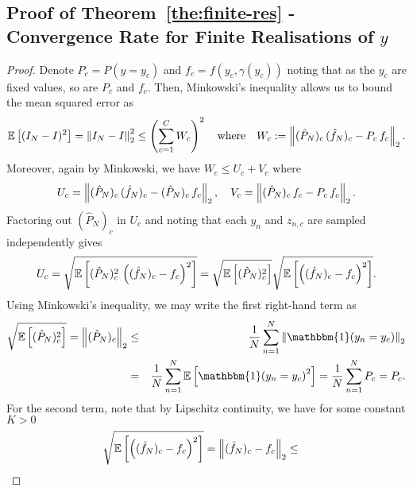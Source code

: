
\subsection{Proof of Theorem~\ref{the:finite-res} - Convergence Rate for Finite Realisations of $y$}
\label{sec:app:finite-res}

\thefiniteres*

\begin{proof}
	Denote
	$P_c = P(y = y_c)$ and
	$f_c = f(y_c, \gamma(y_c))$
	noting that as the $y_c$ are fixed values, so are $P_c$ and $f_c$.
	Then, Minkowski's inequality allows us to bound the mean squared error as
	\begin{eqnarray*}
		\mathbb{E}\left[(I_N - I)^2\right] = \left\lVert I_N - I\right\rVert_2^2
		\leq \left(\sum_{c=1}^C W_c \right)^2 \quad \text{where} \quad W_c := \left\lVert(\hat{P}_N)_c \, (\hat{f}_N)_c - P_c \, f_c\right\rVert_2.
	\end{eqnarray*}
	Moreover, again by Minkowski, we have $W_c \leq U_c + V_c$
	where 
	\[
	U_c = \left\lVert(\hat{P}_N)_c \, (\hat{f}_N)_c - (\hat{P}_N)_c \, f_c\right\rVert_2, \quad
	V_c = \left\lVert(\hat{P}_N)_c \, f_c - P_c \, f_c\right\rVert_2.
	\]
	Factoring out $(\hat{P}_N)_c$ in $U_c$ and noting that each $y_n$ and $z_{n,c}$ are sampled independently gives
	\begin{eqnarray*}
		U_c = \sqrt{\mathbb{E}\left[(\hat{P}_N)_c^2 \, \left((\hat{f}_N)_c - f_c\right)^2\right]} 
		= \sqrt{\mathbb{E}\left[(\hat{P}_N)_c^2\right]} \sqrt{\mathbb{E}\left[\left((\hat{f}_N)_c - f_c\right)^2\right]}.
	\end{eqnarray*}
	Using Minkowski's
	inequality, we may write the first right-hand term as
	\begin{eqnarray*}
		\sqrt{\E\left[(\hat{P}_N)_c^2\right]} = \norm{(\hat{P}_N)_c}_2
		&\leq& \frac{1}{N} \sum_{n=1}^N \norm{\mathbbm{1}(y_n = y_c)}_2 \\
		&=&\frac{1}{N} \sum_{n=1}^N \E \left[{\mathbbm{1}(y_n = y_c)}^2\right] 
		= \frac{1}{N} \sum_{n=1}^N P_c
		= P_c.
	\end{eqnarray*}
	For the second term, note that by Lipschitz continuity, we have for some constant $K >
	0$
	\begin{eqnarray*}
		\sqrt{\E\left[\left((\hat{f}_N)_c - f_c\right)^2\right]} = \norm{(\hat{f}_N)_c - f_c}_2 &\leq& 

\end{eqnarray*}
\end{proof}
